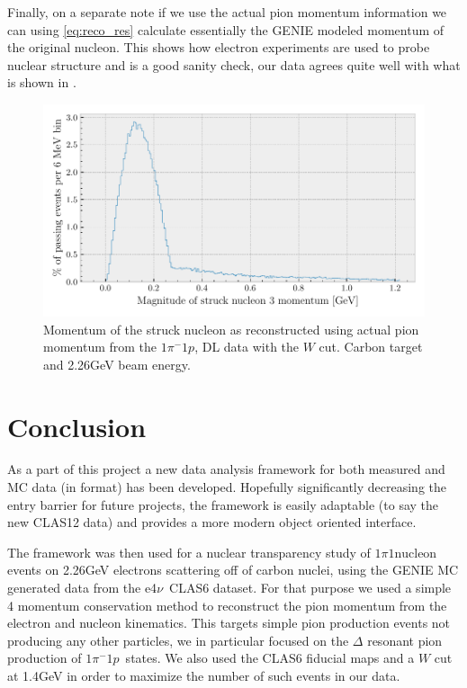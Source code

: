 \documentclass[a4paper,12pt]{article}
\newcommand{\efn}{e4$\nu$}
\newcommand{\verbb}[1]{\text{\Verb|#1|}}
\newcommand{\md}{$1\pi^-1p$}
\begin{document}
Finally, on a separate note if we use the actual pion momentum information we can using \cref{eq:reco_res} calculate essentially the GENIE modeled momentum of the original nucleon.
This shows how electron experiments are used to probe nuclear structure and is a good sanity check, our data agrees quite well with what is shown in \cite{luMeasurementNuclearEffects2016a}.

\begin{figure}[H]
    \centering
    \includegraphics{figures/python/nuc_str1.pdf}
    \caption{
        Momentum of the struck nucleon as reconstructed using actual pion momentum from the \md, DL data with the $W$ cut.
        Carbon target and 2.26\si{GeV} beam energy.
    }\label{fig:p_test_dl_W}
\end{figure}

\section{Conclusion}
As a part of this project a new data analysis framework for both measured and MC data (in \verbb{gst} format) has been developed.
Hopefully significantly decreasing the entry barrier for future projects, the framework is easily adaptable (to say the new CLAS12 data) and provides a more modern object oriented interface.

The framework was then used for a nuclear transparency study of $1\pi1\text{nucleon}$ events on 2.26\si{GeV} electrons scattering off of carbon nuclei, using the GENIE MC generated data from the \efn\ CLAS6 dataset.
For that purpose we used a simple 4 momentum conservation method to reconstruct the pion momentum from the electron and nucleon kinematics.
This targets simple pion production events not producing any other particles, we in particular focused on the $\Delta$ resonant pion production of \md\ states.
We also used the CLAS6 fiducial maps and a $W$ cut at 1.4\si{GeV} in order to maximize the number of such events in our data.
\end{document}
